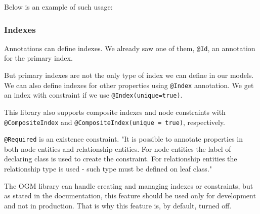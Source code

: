 Below is an example of such usage:


\subsubsection {Indexes}

Annotations can define indexes. We already saw one of them, \texttt{@Id}, an annotation for the primary index.

But primary indexes are not the only type of index we can define in our models. We can also define indexes for other
properties using \texttt{@Index} annotation. We get an index with constraint if we use \texttt{@Index(unique=true)}.

This library also supports composite indexes and node constraints with \texttt{@CompositeIndex} and \texttt{@CompositeIndex(unique = true)}, respectively.

\texttt{@Required} is an existence constraint. "It is possible to annotate properties in both node entities and relationship entities. For node entities
the label of declaring class is used to create the constraint. For relationship entities the relationship type is used - such type must be defined on leaf class." \cite{noauthor_reference_nodate}

The OGM library can handle creating and managing indexes or constraints, but as stated in the documentation, this feature should be used only for development
and not in production. That is why this feature is, by default, turned off.



